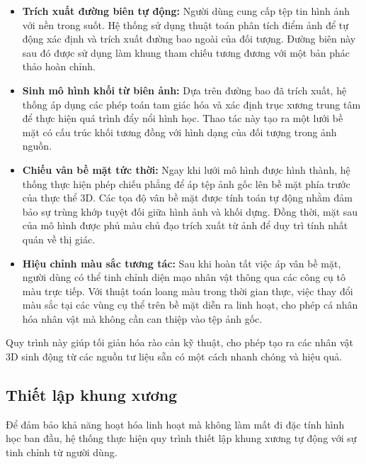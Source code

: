 \documentclass{report}
\begin{document}
\begin{itemize} 
    \item \textbf{Trích xuất đường biên tự động:} Người dùng cung cấp tệp tin hình ảnh với nền trong suốt. Hệ thống sử dụng thuật toán phân tích điểm ảnh để tự động xác định và trích xuất đường bao ngoài của đối tượng. Đường biên này sau đó được sử dụng làm khung tham chiếu tương đương với một bản phác thảo hoàn chỉnh.

    \item \textbf{Sinh mô hình khối từ biên ảnh:} Dựa trên đường bao đã trích xuất, hệ thống áp dụng các phép toán tam giác hóa và xác định trục xương trung tâm để thực hiện quá trình đẩy nổi hình học. Thao tác này tạo ra một lưới bề mặt có cấu trúc khối tương đồng với hình dạng của đối tượng trong ảnh nguồn.

    \item \textbf{Chiếu vân bề mặt tức thời:} Ngay khi lưới mô hình được hình thành, hệ thống thực hiện phép chiếu phẳng để áp tệp ảnh gốc lên bề mặt phía trước của thực thể 3D. Các tọa độ vân bề mặt được tính toán tự động nhằm đảm bảo sự trùng khớp tuyệt đối giữa hình ảnh và khối dựng. Đồng thời, mặt sau của mô hình được phủ màu chủ đạo trích xuất từ ảnh để duy trì tính nhất quán về thị giác.

    \item \textbf{Hiệu chỉnh màu sắc tương tác:} Sau khi hoàn tất việc áp vân bề mặt, người dùng có thể tinh chỉnh diện mạo nhân vật thông qua các công cụ tô màu trực tiếp. Với thuật toán loang màu trong thời gian thực, việc thay đổi màu sắc tại các vùng cụ thể trên bề mặt diễn ra linh hoạt, cho phép cá nhân hóa nhân vật mà không cần can thiệp vào tệp ảnh gốc.
\end{itemize}

Quy trình này giúp tối giản hóa rào cản kỹ thuật, cho phép tạo ra các nhân vật 3D sinh động từ các nguồn tư liệu sẵn có một cách nhanh chóng và hiệu quả.

\subsection{Thiết lập khung xương}

Để đảm bảo khả năng hoạt hóa linh hoạt mà không làm mất đi đặc tính hình học ban đầu, hệ thống thực hiện quy trình thiết lập khung xương tự động với sự tinh chỉnh từ người dùng.
\end{document}
